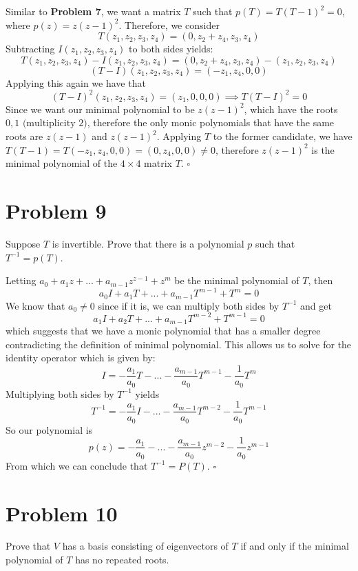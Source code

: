 \documentclass[12pt]{article}
\newenvironment{proof}{\noindent{\bf Proof.}}{\hfill $\square$\medskip}
\begin{document}
\begin{proof}
Similar to \textbf{Problem 7}, we want a matrix $T$ such that $p(T)=T(T-1)^{2}=0$, where $p(z)=z(z-1)^{2}$. Therefore, we consider
$$T(z_{1},z_{2},z_{3},z_{4})=(0,z_{2}+z_{4},z_{3},z_{4})$$
Subtracting $I(z_{1},z_{2},z_{3},z_{4})$ to both sides yields:
$$T(z_{1},z_{2},z_{3},z_{4})-I(z_{1},z_{2},z_{3},z_{4})=(0,z_{2}+z_{4},z_{3},z_{4})-(z_{1},z_{2},z_{3},z_{4})$$
$$(T-I)(z_{1},z_{2},z_{3},z_{4})=(-z_{1},z_{4},0,0)$$
Applying this again we have that
$$(T-I)^{2}(z_{1},z_{2},z_{3},z_{4})=(z_{1},0,0,0)\implies T(T-I)^{2}=0$$
Since we want our minimal polynomial to be $z(z-1)^{2}$, which have the roots $0,1\text{ (multiplicity }2)$, therefore the only monic polynomials that have the same roots are $z(z-1)$ and $z(z-1)^{2}$. Applying $T$ to the former candidate, we have $T(T-1)=T(-z_{1},z_{4},0,0)=(0,z_{4},0,0)\neq0$, therefore $z(z-1)^{2}$ is the minimal polynomial of the $4\times4$ matrix $T$.
\end{proof}


\newpage
\section{Problem 9}
Suppose $T$ is invertible. Prove that there is a polynomial $p$ such that $T^{-1}=p(T)$.

\begin{proof}
Letting $a_{0}+a_{1}z+...+a_{m-1}z^{z-1}+z^{m}$ be the minimal polynomial of $T$, then
$$a_{0}I+a_{1}T+...+a_{m-1}T^{m-1}+T^{m}=0$$
We know that $a_{0}\neq0$ since if it is, we can multiply both sides by $T^{-1}$ and get
$$a_{1}I+a_{2}T+...+a_{m-1}T^{m-2}+T^{m-1}=0$$
which suggests that we have a monic polynomial that has a smaller degree contradicting the definition of minimal polynomial. This allows us to solve for the identity operator which is given by:
$$I=-\frac{a_{1}}{a_{0}}T-...-\frac{a_{m-1}}{a_{0}}T^{m-1}-\frac{1}{a_{0}}T^{m}$$
Multiplying both sides by $T^{-1}$ yields
$$T^{-1}=-\frac{a_{1}}{a_{0}}I-...-\frac{a_{m-1}}{a_{0}}T^{m-2}-\frac{1}{a_{0}}T^{m-1}$$
So our polynomial is 
$$p(z)=-\frac{a_{1}}{a_{0}}-...-\frac{a_{m-1}}{a_{0}}z^{m-2}-\frac{1}{a_{0}}z^{m-1}$$
From which we can conclude that $T^{-1}=P(T)$.
\end{proof}


\newpage
\section{Problem 10}
Prove that $V$ has a basis consisting of eigenvectors of $T$ if and only if the minimal polynomial of $T$ has no repeated roots.
\end{document}
